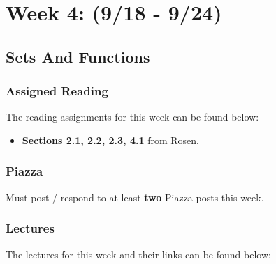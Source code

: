 \clearpage
\chapter{Week 4: (9/18 - 9/24)}

\section{Sets And Functions}

\subsection{Assigned Reading}

The reading assignments for this week can be found below:

\begin{itemize}
    \item \textbf{Sections 2.1, 2.2, 2.3, 4.1} from Rosen.
\end{itemize}

\subsection{Piazza}

Must post / respond to at least \textbf{two} Piazza posts this week.  

\subsection{Lectures}

The lectures for this week and their links can be found below:

